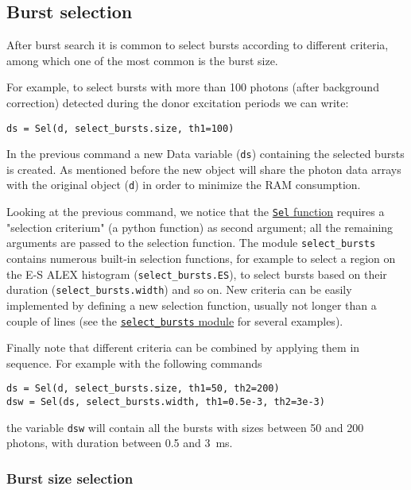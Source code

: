 \subsection{Burst selection}
\label{sec:burstsel}

After burst search it is common to select bursts according to different
criteria, among which one of the most common is the burst size.

For example, to select bursts with more than 100 photons (after background
correction) detected during the donor excitation periods we can write:

\begin{verbatim}
ds = Sel(d, select_bursts.size, th1=100)
\end{verbatim}

In the previous command a new Data variable (\verb|ds|) containing the selected
bursts is created. As mentioned before the new object will share the photon data
arrays with the original object (\verb|d|) in order to minimize the RAM
consumption.

Looking at the previous command, we notice that the
\href{http://fretbursts.readthedocs.org/en/latest/burst\_selection.html#fretbursts.burstlib.Sel}{\texttt{Sel} function}
requires a "selection criterium" (a python function) as second
argument; all the remaining arguments are passed to the selection function. The
module \verb|select_bursts| contains numerous built-in selection functions, for
example to
select a region on the E-S ALEX histogram (\verb|select_bursts.ES|), 
to select bursts based on their duration (\verb|select_bursts.width|) and so on.
New criteria can be easily 
implemented by defining a new selection function, usually not longer than a
couple of lines (see the
\href{https://github.com/tritemio/FRETBursts/blob/master/fretbursts/select\_bursts.py}{\texttt{select\_bursts} module} for several examples).

Finally note that different criteria can be combined by applying them
in sequence. For example with the following commands

\begin{verbatim}
ds = Sel(d, select_bursts.size, th1=50, th2=200)
dsw = Sel(ds, select_bursts.width, th1=0.5e-3, th2=3e-3)
\end{verbatim}

the variable \verb|dsw| will contain all the bursts with sizes between 50 and
200 photons, with duration between 0.5 and 3~ms.

\subsubsection{Burst size selection}

